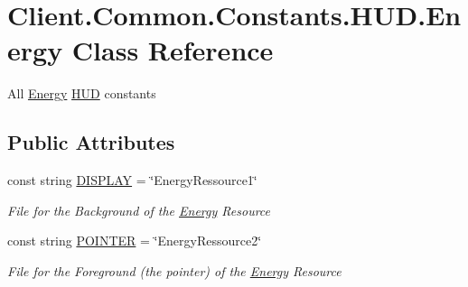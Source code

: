 \hypertarget{classClient_1_1Common_1_1Constants_1_1HUD_1_1Energy}{}\section{Client.\+Common.\+Constants.\+H\+U\+D.\+Energy Class Reference}
\label{classClient_1_1Common_1_1Constants_1_1HUD_1_1Energy}


All \hyperlink{classClient_1_1Common_1_1Constants_1_1HUD_1_1Energy}{Energy} \hyperlink{namespaceClient_1_1Common_1_1Constants_1_1HUD}{H\+U\+D} constants  


\subsection*{Public Attributes}
\begin{DoxyCompactItemize}
\item 
const string \hyperlink{classClient_1_1Common_1_1Constants_1_1HUD_1_1Energy_a087f3ea0c09018ae05a32a6e2dc27d09}{D\+I\+S\+P\+L\+A\+Y} = \char`\"{}Energy\+Ressource1\char`\"{}
\begin{DoxyCompactList}\small\item\em File for the Background of the \hyperlink{classClient_1_1Common_1_1Constants_1_1HUD_1_1Energy}{Energy} Resource \end{DoxyCompactList}\item 
const string \hyperlink{classClient_1_1Common_1_1Constants_1_1HUD_1_1Energy_a472cbd8aba536e5a02dcc0a9114f3b0d}{P\+O\+I\+N\+T\+E\+R} = \char`\"{}Energy\+Ressource2\char`\"{}
\begin{DoxyCompactList}\small\item\em File for the Foreground (the pointer) of the \hyperlink{classClient_1_1Common_1_1Constants_1_1HUD_1_1Energy}{Energy} Resource \end{DoxyCompactList}\end{DoxyCompactItemize}
